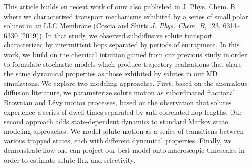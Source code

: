\documentclass[fontsize=11pt]{article}
\begin{document}
	This article builds on recent work of ours also published in J. Phys. Chem. B 
        where we characterized transport mechanisms exhibited by a series of 
	small polar solutes in an LLC Membrane (Coscia and Shirts \textit{J. Phys.
	Chem. B}, 123, 6314--6330 (2019)). In that study, we observed subdiffusive solute transport
	characterized by intermittent hops separated by periods of entrapment. In
	this work, we build on the chemical intuition gained from our previous study
	in order to formulate stochastic models which produce trajectory realizations
	that share the same dynamical properties as those exhibited by solutes in 
	our MD simulations. We explore two modeling approaches. First, based on the
	anomalous diffusion literature, we parameterize solute motion as 
    subordinated fractional Brownian and L\'evy motion processes, based on the observation that 
	solutes experience a series of dwell times separated by anti-correlated hop
	lengths. Our second approach adds state-dependent dynamics to standard Markov
	state modeling approaches. We model solute motion as a series of transitions
	between various trapped states, each with different dynamical properties.
	Finally, we demonstrate how one can project our best model onto macroscopic 
	timescales in order to estimate solute flux and selectivity.
	
\end{document}
